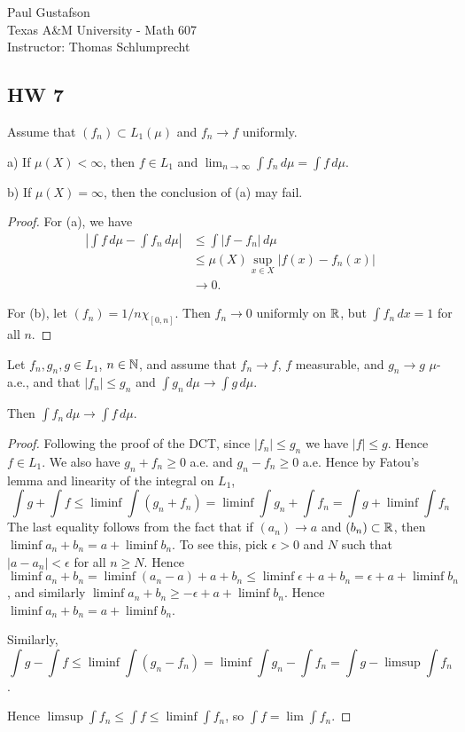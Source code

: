 \documentclass{article}
\begin{document}
\noindent Paul Gustafson\\
\noindent Texas A\&M University - Math 607\\ 
\noindent Instructor: Thomas Schlumprecht

\subsection*{HW 7}
 Assume that $(f_n) \subset L_1(\mu)$ and $f_n \to f$ uniformly.

a) If $\mu(X) < \infty$, then $f \in L_1$ and $\lim_{n\to \infty} \int f_n \, d \mu = \int f \, d\mu$.

b) If $\mu(X) = \infty$, then the conclusion of (a) may fail.

\begin{proof}
For (a), we have
\begin{align*}
\left | \int f \, d \mu - \int f_n \, d \mu \right| & \le \int |f - f_n| \, d \mu
\\ & \le \mu(X) \sup_{x \in X} |f(x) - f_n(x)|
\\ & \to 0.
\end{align*}

For (b), let $(f_n) = 1/n \chi_{[0,n]}$. Then $f_n \to 0$ uniformly on $\mathbb{R}$, but $\int f_n \, dx = 1$ for all $n$.
\end{proof}

 Let $f_n, g_n, g \in L_1$, $n \in \mathbb{N}$, and assume that $f_n \to f$, $f$ measurable, and $g_n \to g$ $\mu$-a.e., and that $|f_n| \le g_n$ and $\int g_n \, d \mu \to \int g \, d\mu$. 

Then $\int f_n \, d \mu \to \int f \, d \mu$.

\begin{proof}
Following the proof of the DCT, since $|f_n| \le g_n$ we have $|f| \le g$. Hence $f \in L_1$. We also have $g_n + f_n \ge 0$ a.e. and $g_n - f_n \ge 0$ a.e.  Hence by Fatou's lemma and linearity of the integral on $L_1$,
$$\int g + \int f \le \liminf \int (g_n + f_n)= \liminf \int g_n +  \int f_n = \int g + \liminf \int f_n$$
The last equality follows from the fact that if $(a_n) \to a$ and $(b_n) \subset \mathbb{R}$, then $\liminf a_n + b_n = a + \liminf b_n$.  To see this, pick $\epsilon > 0$ and $N$ such that $|a - a_n| < \epsilon$ for all $n \ge N$.  Hence $\liminf a_n + b_n = \liminf (a_n - a) + a + b_n \le \liminf \epsilon + a +  b_n = \epsilon + a + \liminf b_n$, and similarly $\liminf a_n + b_n \ge -\epsilon + a + \liminf b_n$.   Hence $\liminf a_n + b_n = a + \liminf b_n$.

Similarly,
$$\int g - \int f \le \liminf \int (g_n - f_n) = \liminf \int g_n -  \int f_n = \int g - \limsup \int f_n$$.

Hence $\limsup \int f_n \le \int f \le \liminf \int f_n$, so $\int f = \lim \int f_n$.
\end{proof}
\end{document}
